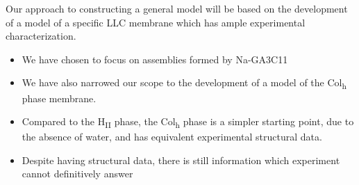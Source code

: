 \documentclass{article}
\begin{document}
  Our approach to constructing a general model will be based on the development of a
  model of a specific LLC membrane which has ample experimental characterization. %
    \begin{itemize}
	    \item We have chosen to focus on assemblies formed by Na-GA3C11
	    \item We have also narrowed our scope to the development of 
	    a model of the Col\textsubscript{h} phase membrane.
	    \item Compared to the H\textsubscript{II} phase, the Col\textsubscript{h}
	    phase is a simpler starting point, due to the absence of water, and has
	    equivalent experimental structural data.
	    \item Despite having structural data, there is still information which 
	    experiment cannot definitively answer
    \end{itemize}



\end{document}
